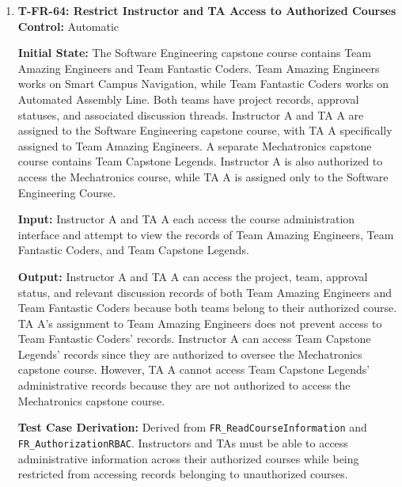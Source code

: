 \documentclass[12pt, titlepage]{article}
\begin{document}
\begin{enumerate}
\textbf{Test Case Derivation:} Derived from \texttt{FR\_ReadCourseInformation}, which requires instructors to access and filter project and team information across their assigned courses. Searching for approved projects records produce exactly two matching team-projects.

\textbf{How Test Will Be Performed:} Populate the course with the specified records. Using Playwright, authenticate as Instructor A and apply the ``Approved'' approval-status filter. Verify that exactly two approved team-projects appear and that their administrative details are accessible.

\item \label{T-FR-64}\textbf{T-FR-64: Restrict Instructor and TA Access to Authorized Courses}\\

\textbf{Control:} Automatic

\textbf{Initial State:} The Software Engineering capstone course contains Team Amazing Engineers and Team Fantastic Coders. Team Amazing Engineers works on Smart Campus Navigation, while Team Fantastic Coders works on Automated Assembly Line. Both teams have project records, approval statuses, and associated discussion threads. Instructor A and TA A are assigned to the Software Engineering capstone course, with TA A specifically assigned to Team Amazing Engineers. A separate Mechatronics capstone course contains Team Capstone Legends. Instructor A is also authorized to access the Mechatronics course, while TA A is assigned only to the Software Engineering Course.

\textbf{Input:} Instructor A and TA A each access the course administration interface and attempt to view the records of Team Amazing Engineers, Team Fantastic Coders, and Team Capstone Legends.

\textbf{Output:} Instructor A and TA A can access the project, team, approval status, and relevant discussion records of both Team Amazing Engineers and Team Fantastic Coders because both teams belong to their authorized course. TA A's assignment to Team Amazing Engineers does not prevent access to Team Fantastic Coders' records. Instructor A can access Team Capstone Legends' records since they are authorized to oversee the Mechatronics capstone course. However, TA A cannot access Team Capstone Legends' administrative records because they are not authorized to access the Mechatronics capstone course.

\textbf{Test Case Derivation:} Derived from \texttt{FR\_ReadCourseInformation} and \texttt{FR\_AuthorizationRBAC}. Instructors and TAs must be able to access administrative information across their authorized courses while being restricted from accessing records belonging to unauthorized courses.


\end{enumerate}
\end{document}
